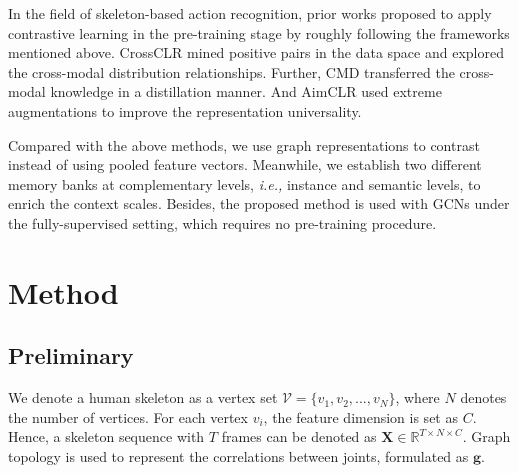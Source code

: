 \documentclass{article} \usepackage{iclr2023_conference,times}
\begin{document}
In the field of skeleton-based action recognition, prior works \citep{crossclr, CMD, Aimclr} proposed to apply contrastive learning in the pre-training stage by roughly following the frameworks mentioned above. CrossCLR \citep{crossclr} mined positive pairs in the data space and explored the cross-modal distribution relationships. Further, CMD \citep{CMD} transferred the cross-modal knowledge in a distillation manner. And AimCLR \citep{Aimclr} used extreme augmentations to improve the representation universality. 

Compared with the above methods, we use graph representations to contrast instead of using pooled feature vectors. Meanwhile, we establish two different memory banks at complementary levels, \emph{i.e.,} instance and semantic levels, to enrich the context scales. Besides, the proposed method is used with GCNs under the fully-supervised setting, which requires no pre-training procedure.




\section{Method}
\subsection{Preliminary}
\label{section:preliminary}
We denote a human skeleton as a vertex set $\mathcal{V}=\{v_1, v_2, ..., v_N\}$, where $N$ denotes the number of vertices. For each vertex $v_i$, the feature dimension is set as $C$. Hence, a skeleton sequence with $T$ frames can be denoted as $\mathbf{X} \in \mathbb{R}^{T \times N \times C}$. Graph topology is used to represent the correlations between joints, formulated as $\mathbf{g}$.
\end{document}
